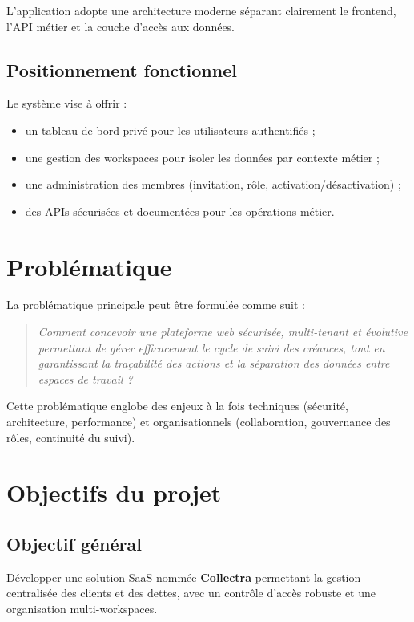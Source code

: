 L'application adopte une architecture moderne séparant clairement le frontend, l'API métier et la couche d'accès aux données.

\subsection{Positionnement fonctionnel}
Le système vise à offrir :
\begin{itemize}
  \item un tableau de bord privé pour les utilisateurs authentifiés ;
  \item une gestion des workspaces pour isoler les données par contexte métier ;
  \item une administration des membres (invitation, rôle, activation/désactivation) ;
  \item des APIs sécurisées et documentées pour les opérations métier.
\end{itemize}

\section{Problématique}
La problématique principale peut être formulée comme suit :

\begin{quote}
\textit{Comment concevoir une plateforme web sécurisée, multi-tenant et évolutive permettant de gérer efficacement le cycle de suivi des créances, tout en garantissant la traçabilité des actions et la séparation des données entre espaces de travail ?}
\end{quote}

Cette problématique englobe des enjeux à la fois techniques (sécurité, architecture, performance) et organisationnels (collaboration, gouvernance des rôles, continuité du suivi).

\section{Objectifs du projet}
\subsection{Objectif général}
Développer une solution SaaS nommée \textbf{Collectra} permettant la gestion centralisée des clients et des dettes, avec un contrôle d'accès robuste et une organisation multi-workspaces.

